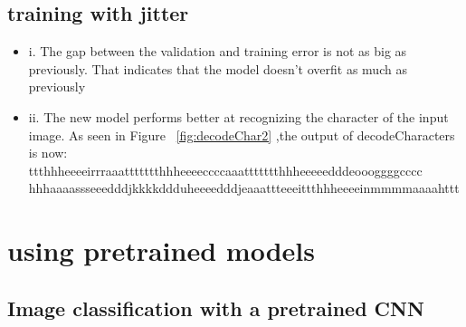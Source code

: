 \documentclass{article}
\begin{document}

\subsection{training with jitter}


\begin{itemize}
\item i. The gap between the validation and training error is not as big as previously. That indicates that the model doesn't overfit as much as previously
\item ii. The new model performs better at recognizing the character of the input image. As seen in Figure ~\ref{fig:decodeChar2} ,the output of decodeCharacters is now: \\
ttthhheeeeirrraaattttttthhheeeeccccaaattttttthhheeeeedddeoooggggcccc \\
hhhaaaassseeedddjkkkkddduheeeedddjeaaattteeeittthhheeeeinmmmmaaaahttt \\
\end{itemize}



\section{using pretrained models}
\subsection{Image classification with a pretrained CNN}

\end{document}
